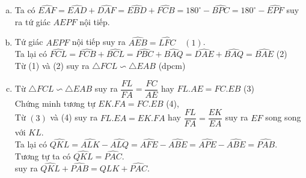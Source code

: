 \begin{ex}
{	
	\begin{enumerate}[a)]  
	\item Ta có $\widehat{EAF} = \widehat{EAD}+\widehat{DAF} = \widehat{EBD}+\widehat{FCB} = 180^\circ -\widehat{BPC} = 180^\circ -\widehat{EPF}$ suy ra tứ giác $AEPF$ nội tiếp.
	
	\item Tứ giác $AEPF$ nội tiếp suy ra $\widehat{AEB} = \widehat{LFC} \quad (1)$.\\
	Ta lại có $\widehat{FCL} = \widehat{FCB} + \widehat{BCL} = \widehat{PBC}+\widehat{BAQ}=\widehat{DAE}+\widehat{BAQ} = \widehat{BAE}$ (2)\\
	Từ (1) và (2) suy ra $\triangle FCL \backsim \triangle EAB$ (dpcm)
	
	\item Từ $\triangle FCL \backsim \triangle EAB$ suy ra $\dfrac{FL}{FA} = \dfrac{FC}{AE}$ hay $FL.AE = FC.EB$ (3)\\
	Chứng minh tương tự $EK.FA = FC.EB$  (4),\\
	Từ $(3)$ và (4) suy ra $FL.EA = EK.FA$ hay $\dfrac{FL}{FA}=\dfrac{EK}{EA}$ suy ra $EF$ song song với $KL$.\\
	Ta lại có $\widehat{QKL} = \widehat{ALK}-\widehat{ALQ} = \widehat{AFE}-\widehat{ABE}=\widehat{APE} - \widehat{ABE} = \widehat{PAB}$.\\
	Tương tự ta có $\widehat{
	QKL} = \widehat{PAC}$.\\
	suy ra $\widehat{QKL}+\widehat{PAB} = \widehat{QLK}+\widehat{PAC}$.
	\end{enumerate}		
	}
\end{ex}













